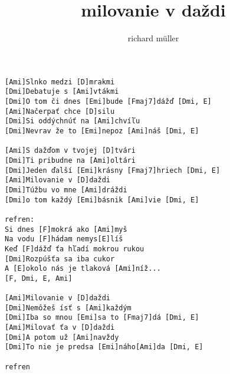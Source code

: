 \author{richard m\"uller}
\title{milovanie v daždi}
\maketitle
\begin{verbatim}
[Ami]Slnko medzi [D]mrakmi
[Dmi]Debatuje s [Ami]vtákmi
[Dmi]O tom či dnes [Emi]bude [Fmaj7]dážď [Dmi, E]
[Ami]Načerpať chce [D]silu
[Dmi]Si oddýchnúť na [Ami]chvíľu
[Dmi]Nevrav že to [Emi]nepoz [Ami]náš [Dmi, E]

[Ami]S dažďom v tvojej [D]tvári
[Dmi]Ti pribudne na [Ami]oltári
[Dmi]Jeden ďalší [Emi]krásny [Fmaj7]hriech [Dmi, E]
[Ami]Milovanie v [D]daždi
[Dmi]Túžbu vo mne [Ami]dráždi
[Dmi]o tom každý [Emi]básnik [Ami]vie [Dmi, E]

refren:
Si dnes [F]mokrá ako [Ami]myš
Na vodu [F]hádam nemys[E]líš
Keď [F]dážď ťa hľadí mokrou rukou
[Dmi]Rozpúšťa sa iba cukor
A [E]okolo nás je tlaková [Ami]níž...
[F, Dmi, E, Ami]

[Ami]Milovanie v [D]daždi
[Dmi]Nemôžeš ísť s [Ami]každým
[Dmi]Iba so mnou [Emi]sa to [Fmaj7]dá [Dmi, E]
[Ami]Milovať ťa v [D]daždi
[Dmi]A potom už [Ami]navždy
[Dmi]To nie je predsa [Emi]náho[Ami]da [Dmi, E]

refren
\end{verbatim}
